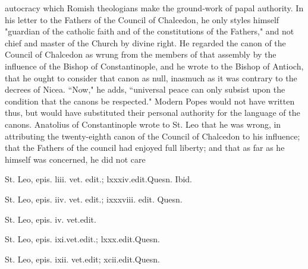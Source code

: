 autocracy which Romish theologians make the ground-work of papal authority. In his letter to the Fathers of the Council of Chalcedon, he only styles himself "guardian of the catholic faith and of the constitutions of the Fathers," and not chief and master of the Church by divine right. He regarded the canon of the Council of Chalcedon as wrung from the members of that assembly by the influence of the Bishop of Constantinople, and he wrote to the Bishop of Antioch, that he ought to consider that canon as null, inasmuch as it was contrary to the decrees of Nicea. “Now," he adds, “universal peace can only subsist upon the condition that the canons be respected." Modern Popes would not have written thus, but would have substituted their personal authority for the language of the canons. Anatolius of Constantinople wrote to St. Leo that he was wrong, in attributing the twenty-eighth canon of the Council of Chalcedon to his influence; that the Fathers of the council had enjoyed full liberty; and that as far as he himself was concerned, he did not care

St. Leo, epis. liii. vet. edit.; lxxxiv.edit.Quesn. Ibid.

St. Leo, epis. iiv. vet. edit.; ixxxviii. edit. Quesn.

St. Leo, epis. iv. vet.edit.

St. Leo, epis. ixi.vet.edit.; lxxx.edit.Quesn.

St. Leo, epis. ixii. vet.edit; xcii.edit.Quesn.

